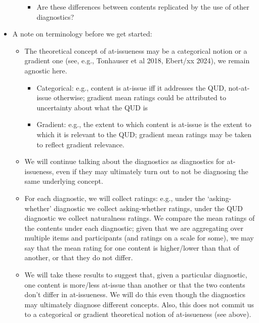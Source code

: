 \documentclass[times,linguex,xcolor]{glossa}
\begin{document}
\begin{itemize}
\begin{itemize}
\begin{itemize}
    \item Are these differences between contents replicated by the use of other diagnostics?

    \end{itemize}

    \end{itemize}

    \item A note on terminology before we get started:

    \begin{itemize}

    \item The theoretical concept of at-issueness may be a categorical notion or a gradient one (see, e.g., Tonhauser et al 2018, Ebert/xx 2024), we remain agnostic here.

    \begin{itemize}

    \item Categorical: e.g., content is at-issue iff it addresses the QUD, not-at-issue otherwise; gradient mean ratings could be attributed to uncertainty about what the QUD is

    \item Gradient: e.g., the extent to which content is at-issue is the extent to which it is relevant to the QUD; gradient mean ratings may be taken to reflect gradient relevance.

    \end{itemize}

    \item We will continue talking about the diagnostics as diagnostics for at-issueness, even if they may ultimately turn out to not be diagnosing the same underlying concept.

    \item For each diagnostic, we will collect ratings: e.g., under the `asking-whether' diagnostic we collect asking-whether ratings, under the QUD diagnostic we collect naturalness ratings. We compare the mean ratings of the contents under each diagnostic; given that we are aggregating over multiple items and participants (and ratings on a scale for some), we may say that the mean rating for one content is higher/lower than that of another, or that they do not differ. 

    \item We will take these results to suggest that, given a particular diagnostic, one content is more/less at-issue than another or that the two contents don't differ in at-issueness. We will do this even though the diagnostics may ultimately diagnose different concepts. Also, this does not commit us to a categorical or gradient theoretical notion of at-issueness (see above).

    \end{itemize}

\end{itemize}  
\end{document}
